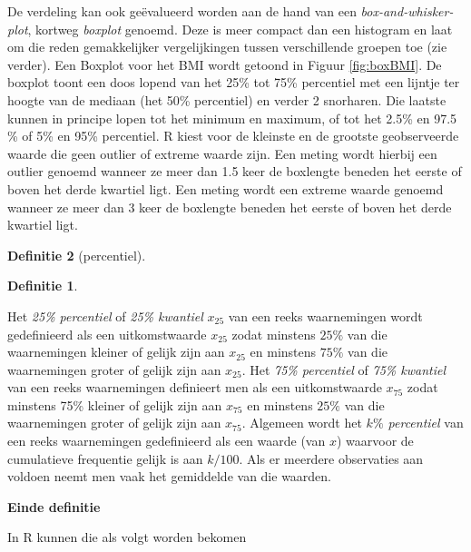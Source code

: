 \documentclass[
  12pt,dutch,coursenotes]{book}
\newenvironment{Shaded}{\begin{snugshade}}{\end{snugshade}}
\newcommand{\DataTypeTok}[1]{\textcolor[rgb]{0.13,0.29,0.53}{#1}}
\newcommand{\FloatTok}[1]{\textcolor[rgb]{0.00,0.00,0.81}{#1}}
\newcommand{\KeywordTok}[1]{\textcolor[rgb]{0.13,0.29,0.53}{\textbf{#1}}}
\newcommand{\NormalTok}[1]{#1}
\newcommand{\OperatorTok}[1]{\textcolor[rgb]{0.81,0.36,0.00}{\textbf{#1}}}
\newcommand{\OtherTok}[1]{\textcolor[rgb]{0.56,0.35,0.01}{#1}}
\theoremstyle{definition}
\newtheorem{definition}{Definitie}[chapter]
\theoremstyle{definition}
\theoremstyle{definition}
\theoremstyle{remark}
\begin{document}
De verdeling kan ook geëvalueerd worden aan de hand van een \emph{box-and-whisker-plot}, kortweg \emph{boxplot} genoemd. Deze is
meer compact dan een histogram en laat om die reden gemakkelijker
vergelijkingen tussen verschillende groepen toe (zie verder). Een Boxplot voor het BMI wordt getoond in Figuur \ref{fig:boxBMI}. De boxplot toont een
doos lopend van het 25\% tot 75\% percentiel met een lijntje ter hoogte van de
mediaan (het 50\% percentiel) en verder 2 snorharen. Die laatste kunnen in principe lopen tot het
minimum en maximum, of tot het 2.5\% en 97.5 \% of 5\% en 95\% percentiel.
R kiest voor de kleinste en de grootste geobserveerde waarde die geen
outlier of extreme waarde zijn. Een meting wordt hierbij een outlier genoemd
wanneer ze meer dan 1.5 keer de boxlengte beneden het eerste of boven het
derde kwartiel ligt. Een meting wordt een extreme waarde genoemd wanneer ze
meer dan 3 keer de boxlengte beneden het eerste of boven het derde kwartiel
ligt.

\begin{definition}[percentiel]
\begin{definition}

\protect\hypertarget{def:unnamed-chunk-90}{}{\label{def:unnamed-chunk-90} \iffalse (percentiel) \fi{} }

\end{definition}
\end{definition}

Het \emph{25\% percentiel} of \emph{25\% kwantiel} \(x_{25}\) van een
reeks waarnemingen wordt gedefinieerd als een uitkomstwaarde \(x_{25}\) zodat
minstens \(25\%\) van die waarnemingen kleiner of gelijk zijn aan \(x_{25}\) en
minstens \(75\%\) van die waarnemingen groter of gelijk zijn aan \(x_{25}\). Het
\emph{75\% percentiel} of \emph{75\% kwantiel} van een reeks
waarnemingen definieert men als een uitkomstwaarde \(x_{75}\) zodat minstens 75\%
kleiner of gelijk zijn aan \(x_{75}\) en minstens \(25\%\) van die waarnemingen
groter of gelijk zijn aan \(x_{75}\). Algemeen wordt het \emph{\(k\%\)
percentiel} van een reeks waarnemingen gedefinieerd als een waarde (van \(x\))
waarvoor de cumulatieve frequentie gelijk is aan \(k/100.\) Als er meerdere
observaties aan voldoen neemt men vaak het gemiddelde van die waarden.

\textbf{Einde definitie}

In R kunnen die als volgt worden bekomen

\begin{Shaded}
\end{Shaded}
\end{document}

